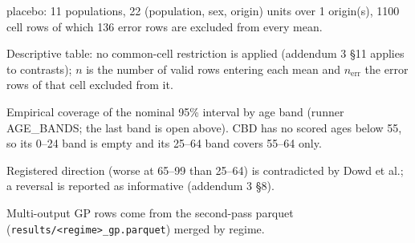 {\begin{minipage}{\linewidth}
\noindent placebo: 11 populations, 22 (population, sex, origin) units over 1 origin(s), 1100 cell rows of which 136 error rows are excluded from every mean.\par
\noindent Descriptive table: no common-cell restriction is applied (addendum 3 \S11 applies to contrasts); $n$ is the number of valid rows entering each mean and $n_{\mathrm{err}}$ the error rows of that cell excluded from it.\par
\noindent Empirical coverage of the nominal 95\% interval by age band (runner AGE\_BANDS; the last band is open above). CBD has no scored ages below 55, so its 0--24 band is empty and its 25--64 band covers 55--64 only.\par
\noindent Registered direction (worse at 65--99 than 25--64) is contradicted by Dowd et al.; a reversal is reported as informative (addendum 3 \S8).\par
\noindent Multi-output GP rows come from the second-pass parquet (\texttt{results/<regime>\_gp.parquet}) merged by regime.\par
\end{minipage}}
